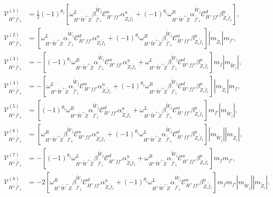 \documentclass[final,3p,times,pdflatex]{elsarticle}
\begin{document}
\begin{align}
\mathcal{V}_{H^{\pm} \tilde{f'}_1}^{(1)} &= \frac{1}{2}(-1)^{\theta_j}[\omega_{H^+ \tilde{W}^+ \tilde{Z}}^L \beta_{\tilde{f'}_1}^{\tilde{W}_j} \mathcal{C}_{H^+ f f'}^u \alpha_{\tilde{Z}_i \tilde{f}_1}^{u} + (-1)^{\theta_j}\omega_{H^+ \tilde{W}^+ \tilde{Z}}^R \alpha_{\tilde{f'}_1}^{\tilde{W}_j} \mathcal{C}_{H^+ f f'}^d \beta_{\tilde{Z}_i \tilde{f}_1}^{u}], \\
\mathcal{V}_{H^{\pm} \tilde{f'}_1}^{(2)} &= [\omega_{H^+ \tilde{W}^+ \tilde{Z}}^L \alpha_{\tilde{f'}_1}^{\tilde{W}_j} \mathcal{C}_{H^+ f f'}^d \alpha_{\tilde{Z}_i \tilde{f}_1}^{u} + (-1)^{\theta_j} \omega_{H^+ \tilde{W}^+ \tilde{Z}}^R \beta_{\tilde{f'}_1}^{\tilde{W}_j} \mathcal{C}_{H^+ f f'}^u \beta_{\tilde{Z}_i \tilde{f}_1}^{u}]|m_{\tilde{Z}_i}|m_{f'}, \\
\mathcal{V}_{H^{\pm} \tilde{f'}_1}^{(3)} &= -[(-1)^{\theta_j}\omega_{H^+ \tilde{W}^+ \tilde{Z}}^R \alpha_{\tilde{f'}_1}^{\tilde{W}_j} \mathcal{C}_{H^+ f f'}^u \alpha_{\tilde{Z}_i \tilde{f}_1}^{u} + \omega_{H^+ \tilde{W}^+ \tilde{Z}}^L \beta_{\tilde{f'}_1}^{\tilde{W}_j} \mathcal{C}_{H^+ f f'}^d \beta_{\tilde{Z}_i \tilde{f}_1}^{u} ]m_{f}|m_{\tilde{W}_j}|, \\
\mathcal{V}_{H^{\pm} \tilde{f'}_1}^{(4)} &= -[\omega_{H^+ \tilde{W}^+ \tilde{Z}}^L \alpha_{\tilde{f'}_1}^{\tilde{W}_j} \mathcal{C}_{H^+ f f'}^u \alpha_{\tilde{Z}_i \tilde{f}_1}^{u} + (-1)^{\theta_j}\omega_{H^+ \tilde{W}^+ \tilde{Z}}^R \beta_{\tilde{f'}_1}^{\tilde{W}_j} \mathcal{C}_{H^+ f f'}^d \beta_{\tilde{Z}_i \tilde{f}_1}^{u}]|m_{\tilde{Z}_i}|m_{f}, \\
\mathcal{V}_{H^{\pm} \tilde{f'}_1}^{(5)} &= [(-1)^{\theta_j}\omega_{H^+ \tilde{W}^+ \tilde{Z}}^R \alpha_{\tilde{f'}_1}^{\tilde{W}_j} \mathcal{C}_{H^+ f f'}^d \alpha_{\tilde{Z}_i \tilde{f}_1}^{u} + \omega_{H^+ \tilde{W}^+ \tilde{Z}}^L \beta_{\tilde{f'}_1}^{\tilde{W}_j} \mathcal{C}_{H^+ f f'}^u \beta_{\tilde{Z}_i \tilde{f}_1}^{u}]m_{f'}|m_{\tilde{W}_j}|, \\
\mathcal{V}_{H^{\pm} \tilde{f'}_1}^{(6)} &= [\omega_{H^+ \tilde{W}^+ \tilde{Z}}^R \beta_{\tilde{f'}_1}^{\tilde{W}_j} \mathcal{C}_{H^+ f f'}^u \alpha_{\tilde{Z}_i \tilde{f}_1}^{u} + (-1)^{\theta_j}\omega_{H^+ \tilde{W}^+ \tilde{Z}}^L \alpha_{\tilde{f'}_1}^{\tilde{W}_j} \mathcal{C}_{H^+ f f'}^d \beta_{\tilde{Z}_i \tilde{f}_1}^{u}]|m_{\tilde{W}_j}||m_{\tilde{Z}_i}|, \\
\mathcal{V}_{H^{\pm} \tilde{f'}_1}^{(7)} &= -[(-1)^{\theta_j}\omega_{H^+ \tilde{W}^+ \tilde{Z}}^L \beta_{\tilde{f'}_1}^{\tilde{W}_j}  \mathcal{C}_{H^+ f f'}^d \alpha_{\tilde{Z}_i \tilde{f}_1}^{u} +  \omega_{H^+ \tilde{W}^+ \tilde{Z}}^R  \alpha_{\tilde{f'}_1}^{\tilde{W}_j} \mathcal{C}_{H^+ f f'}^u \beta_{\tilde{Z}_i \tilde{f}_1}^{u}]m_{f}m_{f'}, \\
\mathcal{V}_{H^{\pm} \tilde{f'}_1}^{(8)} &= -2[\omega_{H^+ \tilde{W}^+ \tilde{Z}}^R \beta_{\tilde{f'}_1}^{\tilde{W}_j} \mathcal{C}_{H^+ f f'}^d \alpha_{\tilde{Z}_i \tilde{f}_1}^{u} + (-1)^{\theta_j}\omega_{H^+ \tilde{W}^+ \tilde{Z}}^L \alpha_{\tilde{f'}_1}^{\tilde{W}_j} \mathcal{C}_{H^+ f f'}^u  \beta_{\tilde{Z}_i \tilde{f}_1}^{u}]m_{f}m_{f'}|m_{\tilde{W}_j}||m_{\tilde{Z}_i}|.
\end{align}
\end{document}
